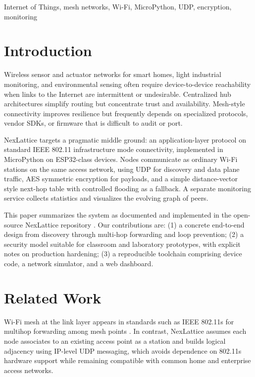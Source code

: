 \documentclass[conference]{IEEEtran}
\begin{document}
\begin{IEEEkeywords}
Internet of Things, mesh networks, Wi-Fi, MicroPython, UDP, encryption, monitoring
\end{IEEEkeywords}

\section{Introduction}
Wireless sensor and actuator networks for smart homes, light industrial monitoring, and environmental sensing often require device-to-device reachability when links to the Internet are intermittent or undesirable. Centralized hub architectures simplify routing but concentrate trust and availability. Mesh-style connectivity improves resilience but frequently depends on specialized protocols, vendor SDKs, or firmware that is difficult to audit or port.

NexLattice targets a pragmatic middle ground: an application-layer protocol on standard IEEE 802.11 infrastructure mode connectivity, implemented in MicroPython on ESP32-class devices. Nodes communicate as ordinary Wi-Fi stations on the same access network, using UDP for discovery and data plane traffic, AES symmetric encryption for payloads, and a simple distance-vector style next-hop table with controlled flooding as a fallback. A separate monitoring service collects statistics and visualizes the evolving graph of peers.

This paper summarizes the system as documented and implemented in the open-source NexLattice repository \cite{nexlattice}. Our contributions are: (1) a concrete end-to-end design from discovery through multi-hop forwarding and loop prevention; (2) a security model suitable for classroom and laboratory prototypes, with explicit notes on production hardening; (3) a reproducible toolchain comprising device code, a network simulator, and a web dashboard.

\section{Related Work}
Wi-Fi mesh at the link layer appears in standards such as IEEE 802.11s for multihop forwarding among mesh points \cite{ieee80211}. In contrast, NexLattice assumes each node associates to an existing access point as a station and builds logical adjacency using IP-level UDP messaging, which avoids dependence on 802.11s hardware support while remaining compatible with common home and enterprise access networks.
\end{document}
